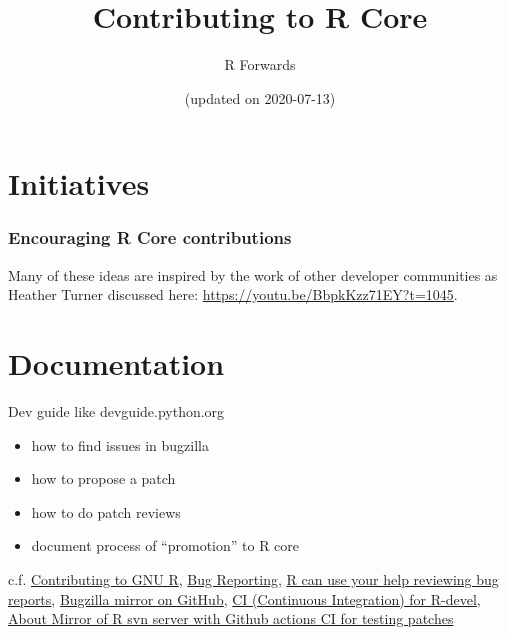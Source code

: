\documentclass[]{book}
\title{Contributing to R Core}
\author{R Forwards}
\date{(updated on 2020-07-13)}
\providecommand{\tightlist}{%
  \setlength{\itemsep}{0pt}\setlength{\parskip}{0pt}}
\begin{document}
\maketitle

{
\setcounter{tocdepth}{1}
\tableofcontents
}
\hypertarget{section}{%
\chapter*{}\label{section}}

\hypertarget{initiatives}{%
\chapter{Initiatives}\label{initiatives}}

\hypertarget{encouraging-r-core-contributions}{%
\subsection{Encouraging R Core contributions}\label{encouraging-r-core-contributions}}

Many of these ideas are inspired by the work of other developer communities as Heather Turner discussed here: \url{https://youtu.be/BbpkKzz71EY?t=1045}.

\hypertarget{documentation}{%
\chapter{Documentation}\label{documentation}}

Dev guide like devguide.python.org

\begin{itemize}
\tightlist
\item
  how to find issues in bugzilla
\item
  how to propose a patch
\item
  how to do patch reviews
\item
  document process of ``promotion'' to R core
\end{itemize}

c.f. \href{https://bookdown.org/lionel/contributing/}{Contributing to GNU R}, \href{https://www.r-project.org/bugs.html}{Bug Reporting}, \href{https://developer.r-project.org/Blog/public/2019/10/09/r-can-use-your-help-reviewing-bug-reports/index.html}{R can use your help reviewing bug reports}, \href{https://github.com/MichaelChirico/r-bugs}{Bugzilla mirror on GitHub}, \href{https://github.com/MichaelChirico/r-core-builder}{CI (Continuous Integration) for R-devel}, \href{https://github.com/jeroen/r-svn}{About
Mirror of R svn server with Github actions CI for testing patches}
\end{document}
